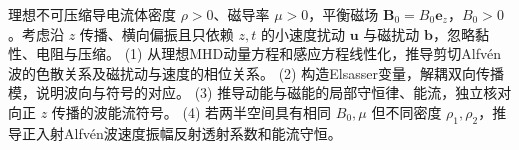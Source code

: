 理想不可压缩导电流体密度 \(\rho>0\)、磁导率 \(\mu>0\)，平衡磁场 \(\boldsymbol B_0=B_0\boldsymbol e_z\)，\(B_0>0\)。考虑沿 \(z\) 传播、横向偏振且只依赖 \(z,t\) 的小速度扰动 \(\boldsymbol u\) 与磁扰动 \(\boldsymbol b\)，忽略黏性、电阻与压缩。
(1) 从理想MHD动量方程和感应方程线性化，推导剪切Alfvén波的色散关系及磁扰动与速度的相位关系。
(2) 构造Elsasser变量，解耦双向传播模，说明波向与符号的对应。
(3) 推导动能与磁能的局部守恒律、能流，独立核对向正 \(z\) 传播的波能流符号。
(4) 若两半空间具有相同 \(B_0,\mu\) 但不同密度 \(\rho_1,\rho_2\)，推导正入射Alfvén波速度振幅反射透射系数和能流守恒。
